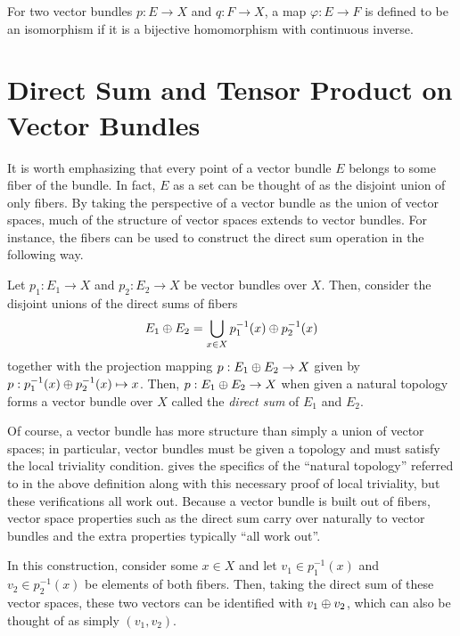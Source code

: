\documentclass[../sean_thesis.tex]{subfiles}
\begin{document}
\begin{definition}[Isomorphism]
	For two vector bundles $p: E \to X$ and $q: F \to X$, a map $\varphi: E \to F$ is defined to be an isomorphism if it is a bijective homomorphism with continuous inverse.
\end{definition}


\section{Direct Sum and Tensor Product on Vector Bundles}

It is worth emphasizing that every point of a vector bundle $E$ belongs to some fiber of the bundle. In fact, $E$ as a set can be thought of as the disjoint union of only fibers. By taking the perspective of a vector bundle as the union of vector spaces, much of the structure of vector spaces extends to vector bundles. For instance, the fibers can be used to construct the direct sum operation in the following way.

\begin{definition}
	Let $p_1: E_1 \to X$ and $p_2: E_2 \to X$ be vector bundles over $X$. Then, consider the disjoint unions of the direct sums of fibers
\begin{equation*}
	E_1 \oplus E_2 = \bigcup_{x \in X} p_1^{-1}(x) \oplus p_2^{-1}(x)
\end{equation*}
together with the projection mapping $p: E_1 \oplus E_2 \to X$ given by $p: p_1^{-1}(x) \oplus p_2^{-1}(x) \mapsto x$. Then, $p: E_1 \oplus E_2 \to X$ when given a natural topology forms a vector bundle over $X$ called the \emph{direct sum} of $E_1$ and $E_2$.
\end{definition}


Of course, a vector bundle has more structure than simply a union of vector spaces; in particular, vector bundles must be given a topology and must satisfy the local triviality condition.  gives the specifics of the ``natural topology'' referred to in the above definition along with this necessary proof of local triviality, but these verifications all work out.  Because a vector bundle is built out of fibers, vector space properties such as the direct sum carry over naturally to vector bundles and the extra properties typically ``all work out''.

In this construction, consider some $x \in X$ and let $v_1 \in p_1^{-1}(x)$ and $v_2 \in p_2^{-1}(x)$ be elements of both fibers. Then, taking the direct sum of these vector spaces, these two vectors can be identified with $v_1 \oplus v_2$, which can also be thought of as simply $(v_1, v_2)$. 
\end{document}
